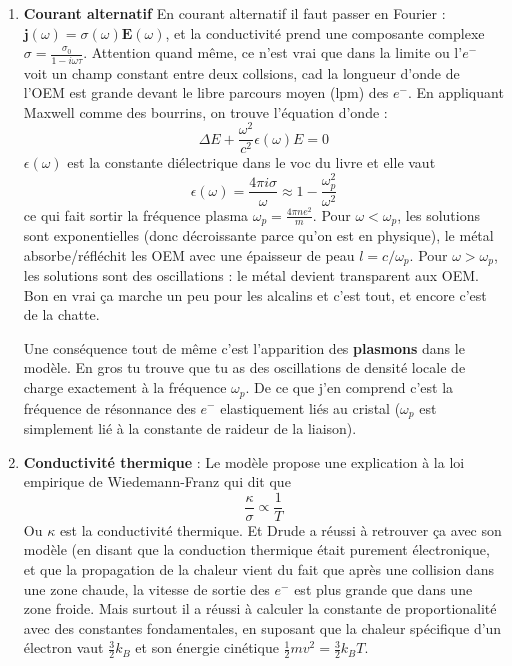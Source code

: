 \documentclass[a4paper]{report}
\begin{document}
\begin{enumerate}
 \item \textbf{Courant alternatif} En courant alternatif il faut passer en Fourier : $\mathbf{j}(\omega)=\sigma(\omega)\mathbf{E}(\omega)$, et la conductivité prend une composante complexe $\sigma=\frac{\sigma_0}{1-i\omega\tau}$. Attention quand même, ce n'est vrai que dans la limite ou l'$e^-$ voit un champ constant entre deux collsions, cad la longueur d'onde de l'OEM est grande devant le libre parcours moyen (lpm) des $e^-$. En appliquant Maxwell comme des bourrins, on trouve l'équation d'onde :
 \begin{equation}
 \Delta E + \frac{\omega^2}{c^2} \epsilon(\omega) E =0
 \end{equation}
 $\epsilon(\omega)$ est la constante diélectrique dans le voc du livre et elle vaut $$ \epsilon(\omega)= \frac{4\pi i \sigma}{\omega} \approx 1-\frac{\omega_p^2}{\omega^2}$$ ce qui fait sortir la fréquence plasma $\omega_p=\frac{4\pi n e^2}{m}$. Pour $\omega < \omega_p$, les solutions sont exponentielles (donc décroissante parce qu'on est en physique), le métal absorbe/réfléchit les OEM avec une épaisseur de peau $l=c/\omega_p$. Pour $\omega > \omega_p$, les solutions sont des oscillations : le métal devient transparent aux OEM.
 Bon en vrai ça marche un peu pour les alcalins et c'est tout, et encore c'est de la chatte.
 
 Une conséquence tout de même c'est l'apparition des \textbf{plasmons} dans le modèle. En gros tu trouve que tu as des oscillations de densité locale de charge exactement à la fréquence $\omega_p$. De ce que j'en comprend c'est la fréquence de résonnance des $e^-$ elastiquement liés au cristal ($\omega_p$ est simplement lié à la constante de raideur de la liaison).
 
 \item \textbf{Conductivité thermique} : Le modèle propose une explication à la loi empirique de Wiedemann-Franz qui dit que $$ \frac{\kappa}{\sigma} \propto \frac{1}{T}$$ Ou  $\kappa$ est la conductivité thermique. Et Drude a réussi à retrouver ça avec son modèle (en disant que la conduction thermique était purement électronique, et que la propagation de la chaleur vient du fait que après une collision dans une zone chaude, la vitesse de sortie des $e^-$ est plus grande que dans une zone froide. Mais surtout il a réussi à calculer la constante de proportionalité avec des constantes fondamentales, en suposant que la chaleur spécifique d'un électron vaut $\frac{3}{2} k_B$ et son énergie cinétique $\frac{1}{2}mv^2=\frac{3}{2}k_BT$. 
 

\end{enumerate}
\end{document}
